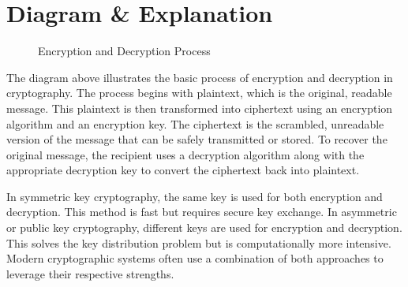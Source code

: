\documentclass{article}
\begin{document}
\section{Diagram \& Explanation}

\begin{figure}[h]
    \centering
    \caption{Encryption and Decryption Process}
    \end{figure}

The diagram above illustrates the basic process of encryption and decryption in cryptography. The process begins with plaintext, which is the original, readable message. This plaintext is then transformed into ciphertext using an encryption algorithm and an encryption key. The ciphertext is the scrambled, unreadable version of the message that can be safely transmitted or stored. To recover the original message, the recipient uses a decryption algorithm along with the appropriate decryption key to convert the ciphertext back into plaintext.

In symmetric key cryptography, the same key is used for both encryption and decryption. This method is fast but requires secure key exchange. In asymmetric or public key cryptography, different keys are used for encryption and decryption. This solves the key distribution problem but is computationally more intensive. Modern cryptographic systems often use a combination of both approaches to leverage their respective strengths.
\end{document}
